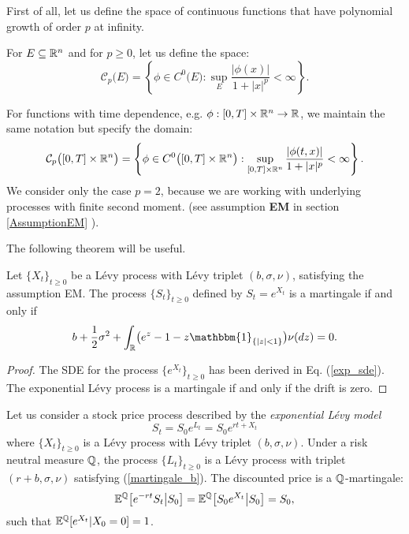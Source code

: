 First of all, let us define the space of continuous functions that have polynomial growth of order $p$ at infinity.
\begin{Definition}\label{Cp}
 For $E \subseteq \mathbb{R}^n$ and for $p\geq 0$, let us define the space:
\begin{equation}
 \mathcal{C}_p \bigl( E \bigr) = \left\{  \phi \in C^0\bigl( E \bigr) : \sup_{E} 
 \frac{|\phi(x)|}{1+|x|^p} <\infty   \right\}. 
\end{equation}
\end{Definition}
For functions with time dependence, e.g. $\phi : [0,T] \times \mathbb{R}^n \to \mathbb{R}$, we maintain the same notation but specify the domain: 
\begin{equation}
 \mathcal{C}_p \bigl([0,T] \times \mathbb{R}^n \bigr) = \left\{  \phi \in C^0\bigl( [0,T] \times \mathbb{R}^n \bigr) : \sup_{[0,T] \times \mathbb{R}^n} 
 \frac{|\phi(t,x)|}{1+|x|^p} <\infty   \right\}. 
\end{equation}
We consider only the case $p=2$, because we are working with underlying processes with finite second moment. (see assumption \textbf{EM} in section \ref{AssumptionEM} ).

The following theorem will be useful.
\begin{Theorem}
 Let $\{X_t\}_{t\geq0}$ be a Lévy process with Lévy triplet $(b,\sigma,\nu)$, satisfying the assumption EM. 
 The process $\{S_t\}_{t\geq0}$ defined by $S_t = e^{X_t}$ is a martingale if and only if
 \begin{equation}\label{martingale_b}
  b +\frac{1}{2} \sigma^2  + \int_{\R} \bigl( e^z-1 -z\mathbbm{1}_{\{ |z|<1 \}} \bigr) \nu(dz) = 0.
 \end{equation}
\end{Theorem}
\begin{proof}
 The SDE for the process $\{e^{X_t}\}_{t\geq0}$ has been derived in Eq. (\ref{exp_sde}). The exponential Lévy process is a martingale if and only if the drift is zero.
\end{proof}
Let us consider a stock price process described by the \emph{exponential Lévy model}
\begin{equation}\label{ELM2}
 S_t = S_0 e^{L_t} = S_0 e^{rt + X_t}
\end{equation}
where $\{X_t\}_{t\geq 0}$ is a Lévy process with Lévy triplet $(b,\sigma,\nu)$. Under a risk neutral measure $\mathbb{Q}$, the process $\{L_t\}_{t\geq 0}$ 
is a Lévy process with triplet $(r+b,\sigma,\nu)$ 
satisfying (\ref{martingale_b}).  
The discounted price is a $\mathbb{Q}$-martingale:
\begin{equation}
 \mathbb{E}^{\mathbb{Q}} \bigl[ e^{-rt} S_t \bigr| S_0 \bigr] =  \mathbb{E}^{\mathbb{Q}} \bigl[ S_0e^{X_t} \bigr| S_0 \bigr] = S_0, 
\end{equation}
such that $\mathbb{E}^{\mathbb{Q}}[ e^{X_t} | X_0=0] = 1 $. 

